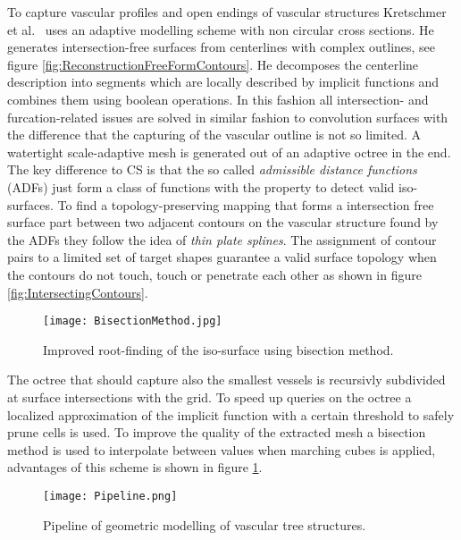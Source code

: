 To capture vascular profiles and open endings of vascular structures Kretschmer et al.~\cite{kretschmer2012reliable} uses an adaptive modelling scheme with non circular cross sections. He generates intersection-free surfaces from centerlines with complex outlines, see figure \ref{fig:ReconstructionFreeFormContours}. He decomposes the centerline description into segments which are locally described by implicit functions and combines them using boolean operations. In this fashion all intersection- and furcation-related issues are solved in similar fashion to convolution surfaces with the difference that the capturing of the vascular outline is not so limited. A watertight scale-adaptive mesh is generated out of an adaptive octree in the end. The key difference to CS is that the so called \emph{admissible distance functions} (ADFs) just form a class of functions with the property to detect valid iso-surfaces. To find a topology-preserving mapping that forms a intersection free surface part between two adjacent contours on the vascular structure found by the ADFs they follow the idea of \emph{thin plate splines}. The assignment of contour pairs to a limited set of target shapes guarantee a valid surface topology when the contours do not touch, touch or penetrate each other as shown in figure \ref{fig:IntersectingContours}.

\begin{figure}[h]
	\centering
	\texttt{[image: BisectionMethod.jpg]} \\
	\caption{Improved root-finding of the iso-surface using bisection method.}
	\cite{kretschmer2012reliable}
	\label{fig:BisectionMethod}
\end{figure} 

The octree that should capture also the smallest vessels is recursivly subdivided at surface intersections with the grid. To speed up queries on the octree a localized approximation of the implicit function with a certain threshold to safely prune cells is used.
To improve the quality of the extracted mesh a bisection method is used to interpolate between values when marching cubes is applied, advantages of this scheme is shown in figure \ref{fig:BisectionMethod}.

\begin{figure}[h]
	\centering
	\texttt{[image: Pipeline.png]} \\
	\caption{Pipeline of geometric modelling of vascular tree structures.}
	\cite{wu2010scale}
	\label{fig:Pipeline}
\end{figure} 

